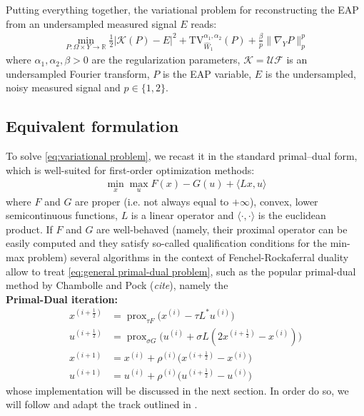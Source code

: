 \documentclass[journal,twoside,web]{ieeecolor}
\newcommand{\R}{\mathbb{R}}
\begin{document}
Putting everything together, the variational problem for reconstructing the EAP from an undersampled measured signal $E$ reads:
\begin{align} \label{eq:variational problem}
    \min_{P:\Omega\times Y \to \R}
    \tfrac{1}{2}| \mathcal{K}(P)-E|^2 + \mathrm{TV}_{\hat{W}_1}^{\alpha_1,\alpha_2}(P) + \tfrac{\beta}{p} \| \nabla_Y P\|_p^p
\end{align}
where $\alpha_1,\alpha_2,\beta > 0$ are the regularization parameters, $\mathcal{K} = \mathcal{UF}$ is an undersampled Fourier transform, $P$ is the EAP variable, $E$ is the undersampled, noisy measured signal and $p\in\{1,2\}$.

\subsection{Equivalent formulation} \label{sec:Equivalent formulation}

To solve \eqref{eq:variational problem}, we recast it in the standard primal–dual form, which is well-suited for first-order optimization methods:
\begin{align} \label{eq:general primal-dual problem}
    \min_x \max_u F(x) - G(u) + \langle Lx , u \rangle
\end{align}
where $F$ and $G$ are proper (i.e. not always equal to $+\infty$), convex, lower semicontinuous functions, $L$ is a linear operator and $\langle \cdot , \cdot \rangle $ is the euclidean product. If $F$ and $G$ are well-behaved (namely, their proximal operator can be easily computed and they satisfy so-called qualification conditions for the min-max problem) several algorithms in the context of Fenchel-Rockaferral duality allow to treat \eqref{eq:general primal-dual problem}, such as the popular primal-dual method by Chambolle and Pock (\textit{cite}), namely the\\

\noindent\textbf{Primal-Dual iteration:}
\begin{equation}
\begin{aligned}
x^{(i+\frac{1}{2})} &= \operatorname{prox}_{\tau F}\big( x^{(i)} - \tau L^* u^{(i)} \big) \\
u^{(i+\frac{1}{2})} &= \operatorname{prox}_{\sigma G}\big( u^{(i)} + \sigma L (2 x^{(i+\frac{1}{2})} - x^{(i)}) \big) \\
x^{(i+1)} &= x^{(i)} + \rho^{(i)} \big( x^{(i+\frac{1}{2})} - x^{(i)} \big) \\
u^{(i+1)} &= u^{(i)} + \rho^{(i)} \big( u^{(i+\frac{1}{2})} - u^{(i)} \big)
\end{aligned}
\label{alg:CP}
\end{equation}
whose implementation will be discussed in the next section. In order do so, we will follow and adapt the track outlined in \cite{TVW_Theory}.
\end{document}
